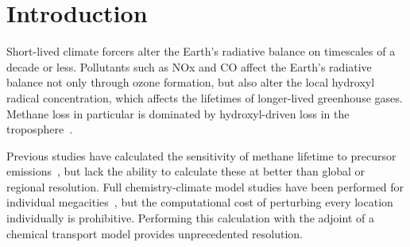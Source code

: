 \section{Introduction}

Short-lived climate forcers alter the Earth's radiative balance on timescales of a decade or less. Pollutants such as NOx and CO affect the Earth's radiative balance not only through ozone formation, but also alter the local hydroxyl radical concentration, which affects the lifetimes of longer-lived greenhouse gases. Methane loss in particular is dominated by hydroxyl-driven loss in the troposphere~\citep{ref:kirschke2013}.

Previous studies have calculated the sensitivity of methane lifetime to precursor emissions~\citep{ref:holmes2013}, but lack the ability to calculate these at better than global or regional resolution. Full chemistry-climate model studies have been performed for individual megacities~\citep{ref:dang2015}, but the computational cost of perturbing every location individually is prohibitive. Performing this calculation with the adjoint of a chemical transport model provides unprecedented resolution.